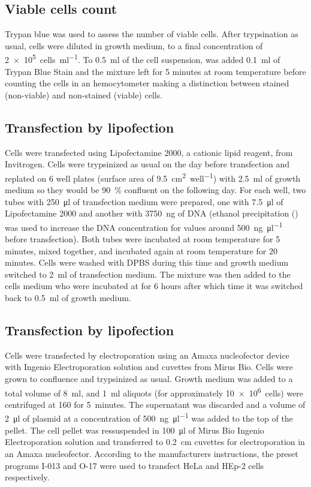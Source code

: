   \subsection{Viable cells count}
    Trypan blue was used to assess the number of viable cells. After trypsination
    as usual, cells were diluted in growth medium, to a final concentration of \SI{2e5}{cells\per\ml}.
    To \SI{0.5}{\ml} of the cell suspension, was added \SI{0.1}{\ml} of  Trypan
    Blue Stain and the mixture left for 5 minutes at room temperature before counting
    the cells in an hemocytometer making a distinction between stained (non-viable)
    and non-stained (viable) cells.

  \subsection{Transfection by lipofection}
    Cells were transfected using Lipofectamine 2000, a cationic lipid reagent, from
    Invitrogen. Cells were trypsinized as usual on the day before transfection and
    replated on 6 well plates (surface area of \SI{9.5}{\square\cm\per well}) with \SI{2.5}{\ml} of growth
    medium so they would be \SI{90}{\percent} confluent on the following day. For each well,
    two tubes with \SI{250}{\ul} of transfection medium were prepared, one with \SI{7.5}{\ul}
    of Lipofectamine 2000 and another with \SI{3750}{\ng} of DNA (ethanol precipitation
    () was used to increase the DNA concentration for values around \SI{500}{\ng\per\ul}
    before transfection). Both tubes were incubated at room temperature for 5 minutes,
    mixed together, and incubated again at room temperature for 20 minutes. Cells
    were washed with DPBS during this time and growth medium switched to \SI{2}{\ml}
    of transfection medium. The mixture was then added to the cells medium who
    were incubated at  for 6 hours after which time it was switched back to
    \SI{0.5}{\ml} of growth medium.

  \subsection{Transfection by lipofection}
    Cells were transfected by electroporation using an Amaxa nucleofector
    device with Ingenio Electroporation solution and cuvettes from Mirus Bio.
    Cells were grown to confluence and trypsinized as usual. Growth medium was
    added to a total volume of \SI{8}{\ml}, and \SI{1}{\ml} aliquots (for
    approximately \SI{10e6}{cells}) were centrifuged at \SI{160}{\gn} for 5~minutes.
    The supernatant was discarded and a volume of \SI{2}{\ul} of plasmid at
    a concentration of \SI{500}{\ng\per\ul} was added to the top of the pellet.
    The cell pellet was ressuspended in \SI{100}{\ul} of Mirus Bio Ingenio
    Electroporation solution and transferred to \SI{0.2}{\cm} cuvettes for
    electroporation in an Amaxa nucleofector. According to the manufacturers
    instructions, the preset programs I-013 and O-17 were used to transfect
    HeLa and HEp-2 cells respectively.


